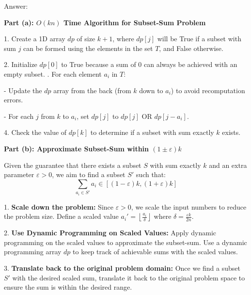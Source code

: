 \documentclass{oxmathproblems}
\begin{document}
\begin{questions}

Answer:

\textbf{Part (a): \( O(kn) \) Time Algorithm for Subset-Sum Problem}

1. Create a 1D array $dp$ of size \(k+1\), where $dp[j]$ will be True if a subset with sum $j$ can be formed using the elements in the set \(T\), and False otherwise.

2. Initialize $dp[0]$ to True because a sum of 0 can always be achieved with an empty subset.
. For each element \(a_i\) in \(T\):

   - Update the $dp$ array from the back (from \(k\) down to \(a_i\)) to avoid recomputation errors. 
   
   - For each \(j\) from \(k\) to \(a_i\), set $dp[j]$ to $dp[j]$ OR $dp[j - a_i]$.
   
4. Check the value of $dp[k]$ to determine if a subset with sum exactly \(k\) exists.

\textbf{Part (b): Approximate Subset-Sum within \((1 \pm \varepsilon)k\)}

Given the guarantee that there exists a subset \(S\) with sum exactly \(k\) and an extra parameter \(\varepsilon > 0\), we aim to find a subset \(S'\) such that:
\[ \sum_{a_i \in S'} a_i \in [(1 - \varepsilon)k, (1 + \varepsilon)k] \]

1. \textbf{Scale down the problem:} Since \(\varepsilon > 0\), we scale the input numbers to reduce the problem size.
Define a scaled value \( a_i' = \left\lfloor \frac{a_i}{\delta} \right\rfloor \) where \(\delta = \frac{\varepsilon k}{2n}\).
   
2. \textbf{Use Dynamic Programming on Scaled Values:} Apply dynamic programming on the scaled values to approximate the subset-sum.
Use a dynamic programming array $dp$ to keep track of achievable sums with the scaled values.

3. \textbf{Translate back to the original problem domain:} Once we find a subset \(S'\) with the desired scaled sum, translate it back to the original problem space to ensure the sum is within the desired range.


\end{questions}
\end{document}
